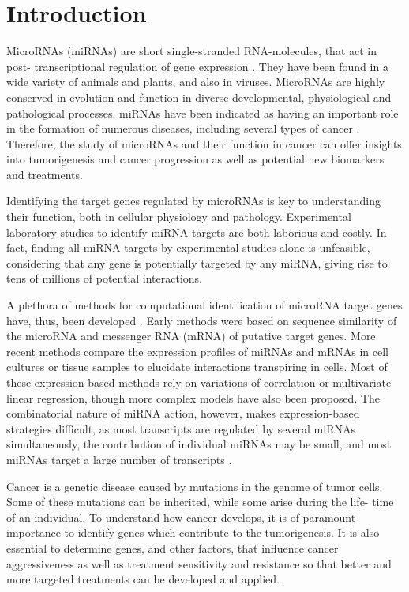 
\section{Introduction}
\thispagestyle{empty}

MicroRNAs (miRNAs) are short single-stranded RNA-molecules, that act in post-
transcriptional regulation of gene expression \citep{Bartel2004}. They have
been found in a wide variety of animals and plants, and also in viruses.
MicroRNAs are highly conserved in evolution and function in diverse
developmental, physiological and pathological processes. miRNAs have been
indicated as having an important role in the formation of numerous diseases,
including several types of cancer \citep{Calin2006}. Therefore, the study of
microRNAs and their function in cancer can offer insights into tumorigenesis
and cancer progression as well as potential new biomarkers and treatments.

Identifying the target genes regulated by microRNAs is key to understanding their
function, both in cellular physiology and pathology. Experimental laboratory
studies to identify miRNA targets are both laborious and costly. In fact,
finding all miRNA targets by experimental studies alone is unfeasible, considering
that any gene is potentially targeted by any miRNA, giving rise to tens of
millions of potential interactions.

A plethora of methods for computational identification of microRNA target
genes have, thus, been developed \citep{Muniategui2013}. Early methods were based on sequence
similarity of the microRNA and messenger RNA (mRNA) of putative target genes.
More recent methods compare the expression profiles of miRNAs and mRNAs in
cell cultures or tissue samples to elucidate interactions transpiring in
cells. Most of these expression-based methods rely on variations of
correlation or multivariate linear regression, though more
complex models have also been proposed. The combinatorial nature of miRNA
action, however, makes expression-based strategies difficult, as most
transcripts are regulated by several miRNAs simultaneously, the contribution
of individual miRNAs may be small, and most miRNAs target a large number of
transcripts \citep{Baek2008}.

Cancer is a genetic disease caused by mutations in the genome of tumor cells.
Some of these mutations can be inherited, while some arise during the life-
time of an individual. To understand how cancer develops, it is of
paramount importance to identify genes which contribute to the tumorigenesis.
It is also essential to determine genes, and other factors, that influence
cancer aggressiveness as well as treatment sensitivity and resistance so that better
and more targeted treatments can be developed and applied.

